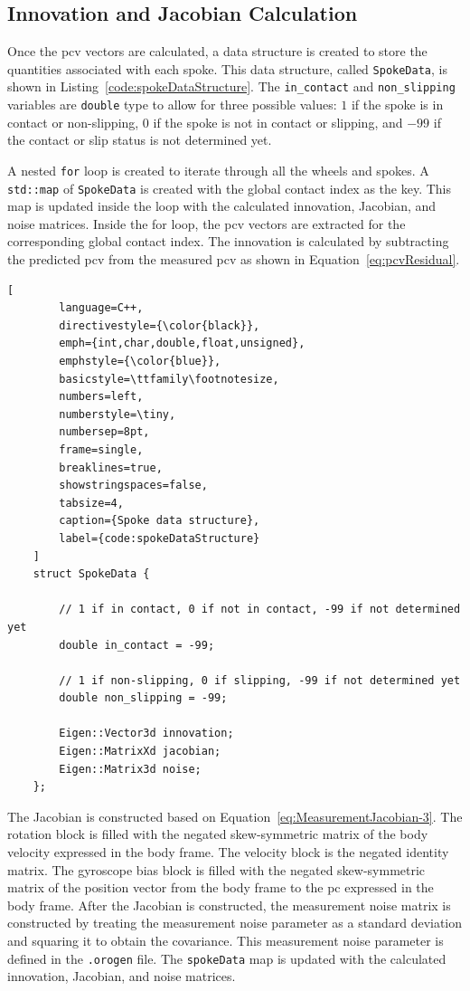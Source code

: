 \documentclass[report.tex]{subfiles}
\begin{document}
    \subsection{Innovation and Jacobian Calculation}  
    
    Once the \gls{pcv} vectors are calculated, a data structure is created to store the quantities associated with each spoke. This data structure, called \texttt{SpokeData}, is shown in Listing~\ref{code:spokeDataStructure}. The \texttt{in\_contact} and \texttt{non\_slipping} variables are \texttt{double} type to allow for three possible values: $1$ if the spoke is in contact or non-slipping, $0$ if the spoke is not in contact or slipping, and $-99$ if the contact or slip status is not determined yet.
    
    A nested \texttt{for} loop is created to iterate through all the wheels and spokes. A \texttt{std::map} of \texttt{SpokeData} is created with the global contact index as the key. This map is updated inside the loop with the calculated innovation, Jacobian, and noise matrices. Inside the for loop, the \gls{pcv} vectors are extracted for the corresponding global contact index. The innovation is calculated by subtracting the predicted \gls{pcv} from the measured \gls{pcv} as shown in Equation~\ref{eq:pcvResidual}. 
        
    \begin{lstlisting}[
        language=C++,
        directivestyle={\color{black}},
        emph={int,char,double,float,unsigned},
        emphstyle={\color{blue}},
        basicstyle=\ttfamily\footnotesize,
        numbers=left,
        numberstyle=\tiny,
        numbersep=8pt,
        frame=single,
        breaklines=true,
        showstringspaces=false,
        tabsize=4,
        caption={Spoke data structure},
        label={code:spokeDataStructure}
    ]
    struct SpokeData {
        
        // 1 if in contact, 0 if not in contact, -99 if not determined yet
        double in_contact = -99; 
        
        // 1 if non-slipping, 0 if slipping, -99 if not determined yet
        double non_slipping = -99; 
        
        Eigen::Vector3d innovation;
        Eigen::MatrixXd jacobian;
        Eigen::Matrix3d noise;
    };
    \end{lstlisting}
        
    The Jacobian is constructed based on Equation~\ref{eq:MeasurementJacobian-3}. The rotation block is filled with the negated skew-symmetric matrix of the body velocity expressed in the body frame. The velocity block is the negated identity matrix. The gyroscope bias block is filled with the negated skew-symmetric matrix of the position vector from the body frame to the \gls{pc} expressed in the body frame. After the Jacobian is constructed, the measurement noise matrix is constructed by treating the measurement noise parameter as a standard deviation and squaring it to obtain the covariance. This measurement noise parameter is defined in the \texttt{.orogen} file. The \texttt{spokeData} map is updated with the calculated innovation, Jacobian, and noise matrices.     
    
\end{document}
